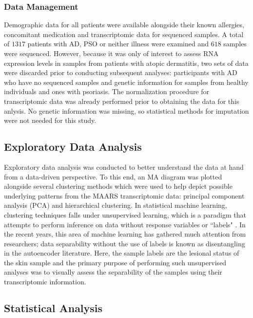 \documentclass[journal, a4paper]{IEEEtran}
\begin{document}

\subsubsection*{Data Management}

Demographic data for all patients were available alongside their known allergies, concomitant medication and transcriptomic data for sequenced samples. A total of $1317$ patients with AD, PSO or neither illness were examined and $618$ samples were sequenced. However, because it was only of interest to assess RNA expression levels in samples from patients with atopic dermatitis, two sets of data were discarded prior to conducting subsequent analyses: participants with AD who have no sequenced samples and genetic information for samples from healthy individuals and ones with psoriasis. The normalization procedure for transcriptomic data was already performed prior to obtaining the data for this anlysis. No genetic information was missing, so statistical methods for imputation were not needed for this study.


\subsection{Exploratory Data Analysis}

Exploratory data analysis was conducted to better understand the data at hand from a data-driven perspective. To this end, an MA diagram was plotted alongside several clustering methods which were used to help depict possible underlying patterns from the MAARS transcriptomic data: principal component analysis (PCA) and hierarchical clustering\cite{maaten2008visualizing-friedman2001elements}. In statistical machine learning, clustering techniques falls under unsupervised learning, which is a paradigm that attempts to perform inference on data without response variables or ``labels" \cite{friedman2001elements}. In the recent years, this area of machine learning has gathered much attention from researchers; data separability without the use of labels is known as disentangling in the autoencoder literature\cite{higgins2017beta}\cite{burgess2018understanding}. Here, the sample labels are the lesional status of the skin sample and the primary purpose of performing such unsupervised analyses was to visually assess the separability of the samples using their transcriptomic information.

\subsection{Statistical Analysis}
\end{document}

